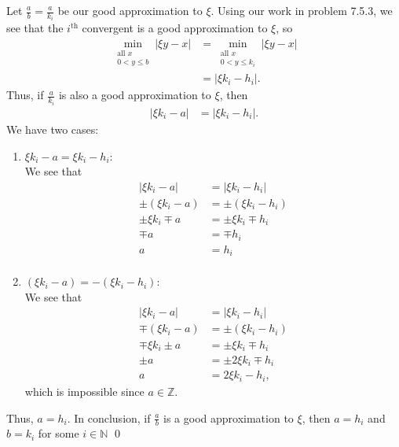 \documentclass[12 pt]{amsart}
\begin{document}
  Let $\frac{a}{b} = \frac{a}{k_i}$ be our good approximation to $\xi$.
  Using our work in problem 7.5.3, we see that the
  $i^{\text{th}}$ convergent is a good approximation to $\xi$, so
  \begin{align*}
    \min_{\substack{\text{all $x$}\\0 < y \leq b}}
    | \xi y - x| 
    &= 
      \min_{\substack{\text{all $x$}\\0 < y \leq k_i}}
      | \xi y - x| \\
    &= 
      | \xi k_i - h_i|.
  \end{align*}
  Thus, if $\frac{a}{k_i}$ is also a good approximation to $\xi$, then
  \begin{align*}
    | \xi k_i - a| &= | \xi k_i - h_i|.
  \end{align*}
  We have two cases:
  \begin{enumerate}[(1)]
    \item $\xi k_i - a = \xi k_i - h_i$: \\
      We see that 
      \begin{align*}
        | \xi k_i - a| &= | \xi k_i - h_i| \\
        \pm(\xi k_i - a) &= \pm(\xi k_i - h_i) \\
        \pm \xi k_i \mp a &= \pm \xi k_i \mp h_i \\
        \mp a &= \mp h_i \\
        a &= h_i \\
      \end{align*}
    \item $(\xi k_i - a) = -(\xi k_i - h_i)$: \\
      We see that 
      \begin{align*}
        | \xi k_i - a| &= | \xi k_i - h_i| \\
        \mp(\xi k_i - a) &= \pm(\xi k_i - h_i) \\
        \mp \xi k_i \pm a &= \pm \xi k_i \mp h_i \\
        \pm a &= \pm 2 \xi k_i \mp h_i \\
        a &= 2 \xi k_i - h_i,
      \end{align*}
      which is impossible since $a \in \mathbb{Z}$.
  \end{enumerate}
  Thus, $a = h_i$.
  In conclusion, if $\frac{a}{b}$ is a good approximation to $\xi$, 
  then $a = h_i$ and $b = k_i$ for some 
  $i \in \mathbb{N}$ 
  \qed
\vfill
\newpage
\end{document}
